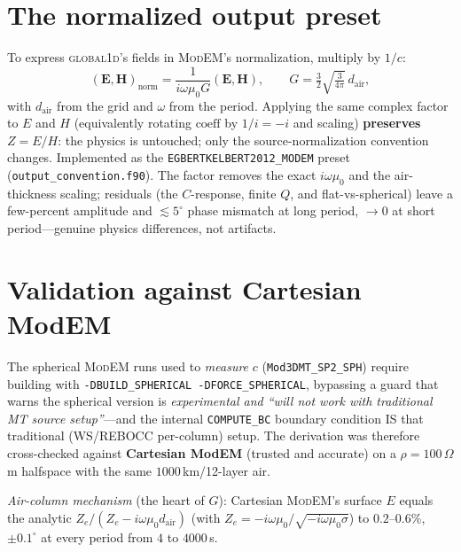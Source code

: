 \documentclass[11pt]{article}
\newcommand{\dair}{d_{\mathrm{air}}}
\begin{document}
\section{The normalized output preset}
To express \textsc{global1d}'s fields in \textsc{ModEM}'s normalization, multiply by $1/c$:
\begin{equation}
(\mathbf E,\mathbf H)_{\mathrm{norm}}=\frac{1}{i\omega\mu_0 G}(\mathbf E,\mathbf H),
\qquad G=\tfrac32\sqrt{\tfrac{3}{4\pi}}\,\dair,
\end{equation}
with $\dair$ from the grid and $\omega$ from the period. Applying the same complex factor to $E$ and
$H$ (equivalently rotating $\mathrm{coeff}$ by $1/i=-i$ and scaling) \textbf{preserves $Z=E/H$}: the
physics is untouched; only the source-normalization convention changes. Implemented as the
\texttt{EGBERTKELBERT2012\_MODEM} preset (\texttt{output\_convention.f90}). The factor removes the
exact $i\omega\mu_0$ and the air-thickness scaling; residuals (the $C$-response, finite $Q$, and
flat-vs-spherical) leave a few-percent amplitude and ${\lesssim}5^\circ$ phase mismatch at long
period, $\to 0$ at short period---genuine physics differences, not artifacts.

\section{Validation against Cartesian ModEM}
The spherical \textsc{ModEM} runs used to \emph{measure} $c$ (\texttt{Mod3DMT\_SP2\_SPH}) require
building with \texttt{-DBUILD\_SPHERICAL -DFORCE\_SPHERICAL}, bypassing a guard that warns the
spherical version is \emph{experimental and ``will not work with traditional MT source setup''}---and
the internal \texttt{COMPUTE\_BC} boundary condition IS that traditional (WS/REBOCC per-column) setup.
The derivation was therefore cross-checked against \textbf{Cartesian ModEM} (trusted and accurate) on
a $\rho{=}100\,\Omega$m halfspace with the same $1000\,$km/12-layer air.

\emph{Air-column mechanism} (the heart of $G$): Cartesian \textsc{ModEM}'s surface $E$ equals the
analytic $Z_e/(Z_e-i\omega\mu_0\dair)$ (with $Z_e=-i\omega\mu_0/\sqrt{-i\omega\mu_0\sigma}$) to
$0.2$--$0.6\%$, $\pm0.1^\circ$ at every period from $4$ to $4000\,$s.
\end{document}
